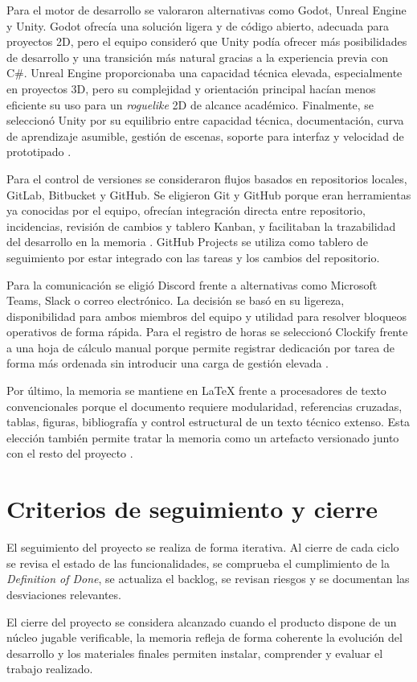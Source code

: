 Para el motor de desarrollo se valoraron alternativas como Godot, Unreal Engine y Unity.
Godot ofrecía una solución ligera y de código abierto, adecuada para proyectos 2D, pero el
equipo consideró que Unity podía ofrecer más posibilidades de desarrollo y una transición
más natural gracias a la experiencia previa con C\#. Unreal Engine proporcionaba una
capacidad técnica elevada, especialmente en proyectos 3D, pero su complejidad y orientación
principal hacían menos eficiente su uso para un \textit{roguelike} 2D de alcance académico.
Finalmente, se seleccionó Unity por su equilibrio entre capacidad técnica, documentación,
curva de aprendizaje asumible, gestión de escenas, soporte para interfaz y velocidad de
prototipado \cite{unityLearnGettingStarted}.

Para el control de versiones se consideraron flujos basados en repositorios locales,
GitLab, Bitbucket y GitHub. Se eligieron Git y GitHub porque eran herramientas ya conocidas
por el equipo, ofrecían integración directa entre repositorio, incidencias, revisión de
cambios y tablero Kanban, y facilitaban la trazabilidad del desarrollo en la memoria
\cite{githubIssuesProjects}. GitHub Projects se utiliza como tablero de seguimiento por
estar integrado con las tareas y los cambios del repositorio.

Para la comunicación se eligió Discord frente a alternativas como Microsoft Teams, Slack o
correo electrónico. La decisión se basó en su ligereza, disponibilidad para ambos miembros
del equipo y utilidad para resolver bloqueos operativos de forma rápida. Para el registro de
horas se seleccionó Clockify frente a una hoja de cálculo manual porque permite registrar
dedicación por tarea de forma más ordenada sin introducir una carga de gestión elevada
\cite{clockifyOfficial}.

Por último, la memoria se mantiene en LaTeX frente a procesadores de texto convencionales
porque el documento requiere modularidad, referencias cruzadas, tablas, figuras,
bibliografía y control estructural de un texto técnico extenso. Esta elección también
permite tratar la memoria como un artefacto versionado junto con el resto del proyecto
\cite{latexProject}.

\section{Criterios de seguimiento y cierre}
El seguimiento del proyecto se realiza de forma iterativa. Al cierre de cada ciclo se revisa
el estado de las funcionalidades, se comprueba el cumplimiento de la
\textit{Definition of Done}, se actualiza el backlog, se revisan riesgos y se documentan las
desviaciones relevantes.

El cierre del proyecto se considera alcanzado cuando el producto dispone de un núcleo
jugable verificable, la memoria refleja de forma coherente la evolución del desarrollo y los
materiales finales permiten instalar, comprender y evaluar el trabajo realizado.
